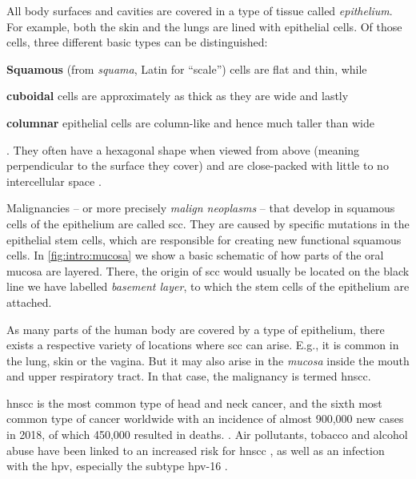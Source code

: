 \documentclass[\relativeRoot/main.tex]{subfiles}
\begin{document}
All body surfaces and cavities are covered in a type of tissue called \emph{epithelium}. For example, both the skin and the lungs are lined with epithelial cells. Of those cells, three different basic types can be distinguished:
\begin{enumerate*}[label={(\arabic*)}]
    \item \textbf{Squamous} (from \emph{squama}, Latin for ``scale'') cells are flat and thin, while 
    \item \textbf{cuboidal} cells are approximately as thick as they are wide and lastly
    \item \textbf{columnar} epithelial cells are column-like and hence much taller than wide
\end{enumerate*}.
They often have a hexagonal shape when viewed from above (meaning perpendicular to the surface they cover) and are close-packed with little to no intercellular space \cite{marieb_human_1995}.

Malignancies -- or more precisely \emph{malign neoplasms} -- that develop in squamous cells of the epithelium are called \gls{scc}. They are caused by specific mutations in the epithelial stem cells, which are responsible for creating new functional squamous cells. In \cref{fig:intro:mucosa} we show a basic schematic of how parts of the oral mucosa are layered. There, the origin of \gls{scc} would usually be located on the black line we have labelled \emph{basement layer}, to which the stem cells of the epithelium are attached.

As many parts of the human body are covered by a type of epithelium, there exists a respective variety of locations where \gls{scc} can arise. E.g., it is common in the lung, skin or the vagina. But it may also arise in the \emph{mucosa} inside the mouth and upper respiratory tract. In that case, the malignancy is termed \gls{hnscc}.

\gls{hnscc} is the most common type of head and neck cancer, and the sixth most common type of cancer worldwide with an incidence of almost 900,000 new cases in 2018, of which 450,000 resulted in deaths. \cite{johnson_head_2020,ferlay_estimating_2019,bray_global_2018}. Air pollutants, tobacco and alcohol abuse have been linked to an increased risk for \gls{hnscc} \cite{johnson_head_2020,wong_cancers_2014}, as well as an infection with the \gls{hpv}, especially the subtype \gls{hpv}-16 \cite{hennessey_human_2009}.
\end{document}
